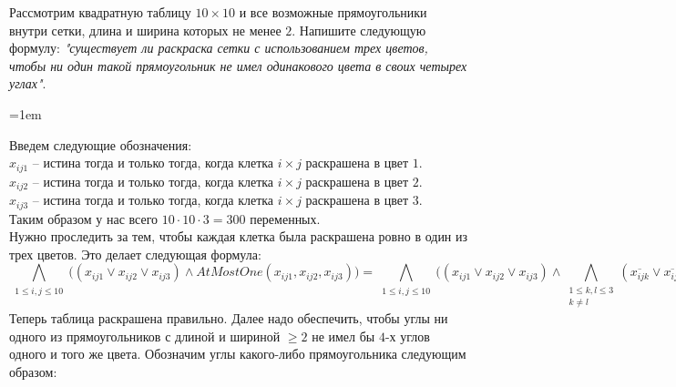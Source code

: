 \documentclass[12pt]{extreport}
\theoremstyle{definiton}
\theoremstyle{definition}
\theoremstyle{definition}
\let\leq\leqslant
\let\geq\geqslant
\newcommand{\solution}[2][\color{myblue}Решение]{
\medskip
	\noindent{\bfseries #1 }{{\color{myblue}\bfseries #2:}}
}
\newenvironment{blockquote}{%
  \par%
  \medskip
  \leftskip=1em%
  \noindent}{%
  \par\medskip}
\begin{document}
\Pr[10 баллов] Рассмотрим квадратную таблицу $10 \times 10$ и все возможные прямоугольники внутри сетки, длина и ширина которых не менее $2$. Напишите следующую формулу: \textit{"существует ли раскраска сетки с использованием трех цветов, чтобы ни один такой прямоугольник не имел одинакового цвета в своих четырех углах"}.

    \solution{5}
    \begin{blockquote}
    {\color{myblue}
    \noindent Введем следующие обозначения:\\
    $x_{ij1}$ -- истина тогда и только тогда, когда клетка $i \times j$ раскрашена в цвет $1$.\\
    $x_{ij2}$ -- истина тогда и только тогда, когда клетка $i \times j$ раскрашена в цвет $2$.\\
    $x_{ij3}$ -- истина тогда и только тогда, когда клетка $i \times j$ раскрашена в цвет $3$.\\
    Таким образом у нас всего $10 \cdot 10 \cdot 3 = 300$ переменных.\\
    Нужно проследить за тем, чтобы каждая клетка была раскрашена ровно в один из трех цветов. Это делает следующая формула:
    $$\bigwedge\limits_{\substack{1 \leq i, j \leq 10}} \Big((x_{ij1} \vee x_{ij2} \vee x_{ij3}) \wedge AtMostOne(x_{ij1}, x_{ij2}, x_{ij3})\Big)= \bigwedge\limits_{\substack{1 \leq i, j \leq 10}} \Big((x_{ij1} \vee x_{ij2} \vee x_{ij3}) \wedge \bigwedge\limits_{\substack{1 \leq k, l \leq 3 \\ k \neq l}} (\overline{x_{ijk}} \vee \overline{x_{ijl}}) \Big)$$
    Теперь таблица раскрашена правильно. Далее надо обеспечить, чтобы углы ни одного из прямоугольников с длиной и шириной $\geq 2$ не имел бы $4$-х углов одного и того же цвета.
    Обозначим углы какого-либо прямоугольника следующим образом:
    \begin{center}
\end{center}}
\end{blockquote}
\end{document}
